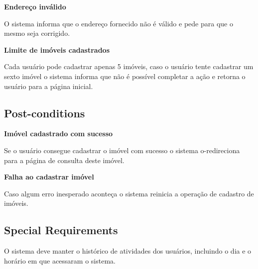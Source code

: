 \textbf{Endereço inválido}

O sistema informa que o endereço fornecido não é válido e pede para que o mesmo seja corrigido.

\textbf{Limite de imóveis cadastrados}

Cada usuário pode cadastrar apenas 5 imóveis, caso o usuário tente cadastrar um sexto imóvel o
sistema informa que não é possível completar a ação e retorna o usuário para a página inicial.

\subsection*{Post-conditions}

\textbf{Imóvel cadastrado com sucesso}

Se o usuário consegue cadastrar o imóvel com sucesso o sistema o-redireciona para a página de
consulta deste imóvel.

\textbf{Falha ao cadastrar imóvel}

Caso algum erro inesperado aconteça o sistema reinicia a operação de cadastro de imóveis.


\subsection*{Special Requirements} 
O sistema deve manter o histórico de atividades dos usuários, incluindo o dia e o horário em que
acessaram o sistema.

